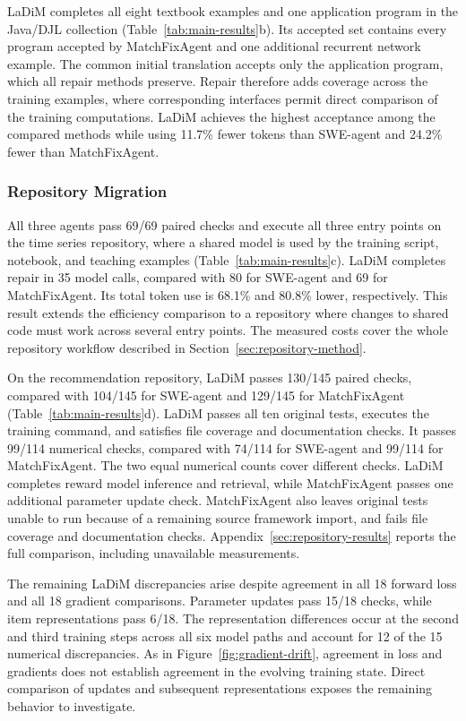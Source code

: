 LaDiM completes all eight textbook examples and one application program in the Java/DJL collection (Table~\ref{tab:main-results}b). Its accepted set contains every program accepted by MatchFixAgent and one additional recurrent network example. The common initial translation accepts only the application program, which all repair methods preserve. Repair therefore adds coverage across the training examples, where corresponding interfaces permit direct comparison of the training computations. LaDiM achieves the highest acceptance among the compared methods while using 11.7\% fewer tokens than SWE-agent and 24.2\% fewer than MatchFixAgent.

\subsubsection{Repository Migration}

All three agents pass 69/69 paired checks and execute all three entry points on the time series repository, where a shared model is used by the training script, notebook, and teaching examples (Table~\ref{tab:main-results}c). LaDiM completes repair in 35 model calls, compared with 80 for SWE-agent and 69 for MatchFixAgent. Its total token use is 68.1\% and 80.8\% lower, respectively. This result extends the efficiency comparison to a repository where changes to shared code must work across several entry points. The measured costs cover the whole repository workflow described in Section~\ref{sec:repository-method}.

On the recommendation repository, LaDiM passes 130/145 paired checks, compared with 104/145 for SWE-agent and 129/145 for MatchFixAgent (Table~\ref{tab:main-results}d). LaDiM passes all ten original tests, executes the training command, and satisfies file coverage and documentation checks. It passes 99/114 numerical checks, compared with 74/114 for SWE-agent and 99/114 for MatchFixAgent. The two equal numerical counts cover different checks. LaDiM completes reward model inference and retrieval, while MatchFixAgent passes one additional parameter update check. MatchFixAgent also leaves original tests unable to run because of a remaining source framework import, and fails file coverage and documentation checks. Appendix~\ref{sec:repository-results} reports the full comparison, including unavailable measurements.

The remaining LaDiM discrepancies arise despite agreement in all 18 forward loss and all 18 gradient comparisons. Parameter updates pass 15/18 checks, while item representations pass 6/18. The representation differences occur at the second and third training steps across all six model paths and account for 12 of the 15 numerical discrepancies. As in Figure~\ref{fig:gradient-drift}, agreement in loss and gradients does not establish agreement in the evolving training state. Direct comparison of updates and subsequent representations exposes the remaining behavior to investigate.

